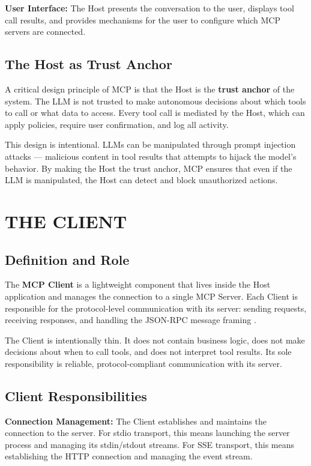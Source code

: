 \textbf{User Interface:} The Host presents the conversation to the user, displays tool call results, and provides mechanisms for the user to configure which MCP servers are connected.

\section{The Host as Trust Anchor}
A critical design principle of MCP is that the Host is the \textbf{trust anchor} of the system. The LLM is not trusted to make autonomous decisions about which tools to call or what data to access. Every tool call is mediated by the Host, which can apply policies, require user confirmation, and log all activity.

This design is intentional. LLMs can be manipulated through prompt injection attacks — malicious content in tool results that attempts to hijack the model's behavior. By making the Host the trust anchor, MCP ensures that even if the LLM is manipulated, the Host can detect and block unauthorized actions.

\chapter{THE CLIENT}

\section{Definition and Role}
The \textbf{MCP Client} is a lightweight component that lives inside the Host application and manages the connection to a single MCP Server. Each Client is responsible for the protocol-level communication with its server: sending requests, receiving responses, and handling the JSON-RPC message framing \cite{anthropic2024mcp}.

The Client is intentionally thin. It does not contain business logic, does not make decisions about when to call tools, and does not interpret tool results. Its sole responsibility is reliable, protocol-compliant communication with its server.

\section{Client Responsibilities}
\textbf{Connection Management:} The Client establishes and maintains the connection to the server. For stdio transport, this means launching the server process and managing its stdin/stdout streams. For SSE transport, this means establishing the HTTP connection and managing the event stream.

